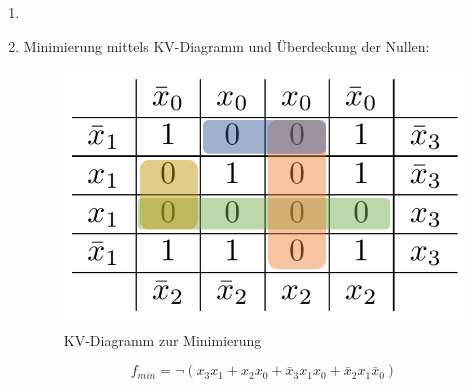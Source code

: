 \documentclass[a4paper]{article}
\begin{document}
\begin{enumerate}[label=\alph*)]
	\item 
	
	\item Minimierung mittels KV-Diagramm und Überdeckung der Nullen:

	\begin{figure}[h!]
		\begin{center}
			\includegraphics[scale=0.25]{KV_Diagramm_inv.png}
		\end{center}
		\caption{KV-Diagramm zur Minimierung}
	\end{figure}

	\begin{equation*}
	f_{min} = \neg(x_3x_1 + x_2x_0 + \bar{x}_3x_1x_0 + \bar{x}_2x_1\bar{x}_0)
	\end{equation*} 

\end{enumerate}
\end{document}
